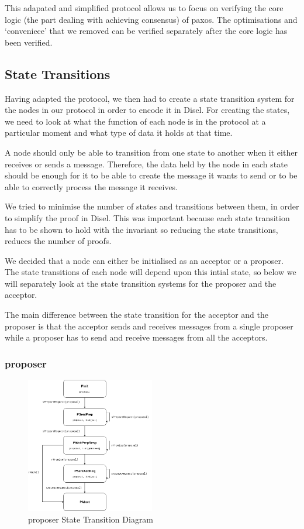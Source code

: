 This adapated and simplified protocol allows us to focus on verifying the core
logic (the part dealing with achieving consensus) of paxos. The
optimisations and `conveniece' that we removed can be verified separately after
the core logic has been verified.


\subsection{State Transitions}
Having adapted the protocol, we then had to create a state transition system for
the nodes in our protocol in order to encode it in Disel. For creating the states,
we need to look at what the function of each node is in the protocol at a particular
moment and what type of data it holds at that time.

A node should only be able to transition from one state to another when it either
receives or sends a message. Therefore, the data held by the node in each state
should be enough for it to be able to create the message it wants to send or to
be able to correctly process the message it receives.

We tried to minimise the number of states and transitions between them, in order
to simplify the proof in Disel. This was important because each state transition
has to be shown to hold with the invariant so reducing the state transitions,
reduces the number of proofs.

We decided that a node can either be initialised as an acceptor or a proposer.
The state transitions of each node will depend upon this intial state, so below
we will separately look at the state transition systems for the proposer and the
acceptor.

The main difference between the state transition for the acceptor and the proposer
is that the acceptor sends and receives messages from a single proposer while a
proposer has to send and receive messages from all the acceptors.


\subsubsection{proposer}
\begin{figure}
\centering
\includegraphics[width=0.5\textwidth]{figures/proposer_state_transitions.png}
\caption{proposer State Transition Diagram
\label{fig:myInlineFigure}}
\end{figure}

